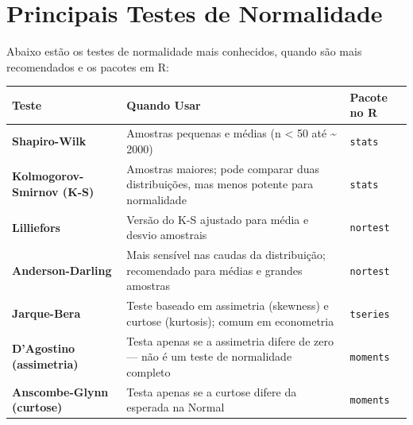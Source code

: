 \documentclass[
]{book}
\newcounter{none} %
\begin{document}
\section{Principais Testes de Normalidade}\label{principais-testes-de-normalidade}

Abaixo estão os testes de normalidade mais conhecidos, quando são mais recomendados e os pacotes em R:

{\def\LTcaptype{none} %
\begin{longtable}[]{@{}
  >{\raggedright\arraybackslash}p{}
  >{\raggedright\arraybackslash}p{}
  >{\raggedright\arraybackslash}p{}@{}}
\toprule\noalign{}
\begin{minipage}[b]{\linewidth}\raggedright
Teste
\end{minipage} & \begin{minipage}[b]{\linewidth}\raggedright
Quando Usar
\end{minipage} & \begin{minipage}[b]{\linewidth}\raggedright
Pacote no R
\end{minipage} \\
\midrule\noalign{}
\endhead
\bottomrule\noalign{}
\endlastfoot
\textbf{Shapiro-Wilk} & Amostras pequenas e médias (n \textless{} 50 até \textasciitilde{} 2000) & \texttt{stats} \\
\textbf{Kolmogorov-Smirnov (K-S)} & Amostras maiores; pode comparar duas distribuições, mas menos potente para normalidade & \texttt{stats} \\
\textbf{Lilliefors} & Versão do K-S ajustado para média e desvio amostrais & \texttt{nortest} \\
\textbf{Anderson-Darling} & Mais sensível nas caudas da distribuição; recomendado para médias e grandes amostras & \texttt{nortest} \\
\textbf{Jarque-Bera} & Teste baseado em assimetria (skewness) e curtose (kurtosis); comum em econometria & \texttt{tseries} \\
\textbf{D'Agostino (assimetria)} & Testa apenas se a assimetria difere de zero --- não é um teste de normalidade completo & \texttt{moments} \\
\textbf{Anscombe-Glynn (curtose)} & Testa apenas se a curtose difere da esperada na Normal & \texttt{moments} \\
\end{longtable}
}
\end{document}
